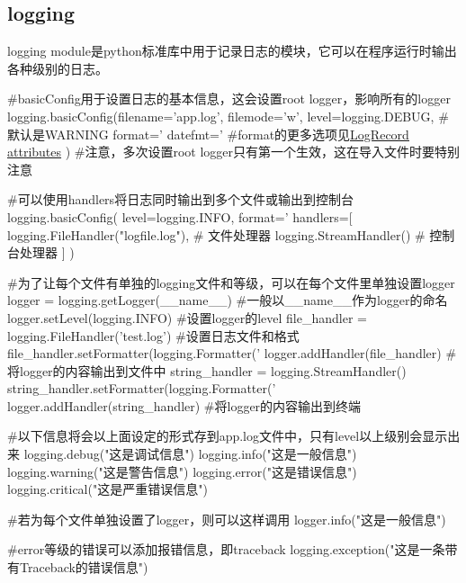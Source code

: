   \subsection{logging}
    logging module是python标准库中用于记录日志的模块，它可以在程序运行时输出各种级别的日志。
    \begin{codeblock}[language=python, caption={logging module}]
      #basicConfig用于设置日志的基本信息，这会设置root logger，影响所有的logger
      logging.basicConfig(filename='app.log', filemode='w', 
                  level=logging.DEBUG, #默认是WARNING
                  format='%
                  datefmt='%
                      #format的更多选项见\href{https://docs.python.org/3/library/logging.html#logrecord-attributes}{\underline{LogRecord attributes}}
                  )
      #注意，多次设置root logger只有第一个生效，这在导入文件时要特别注意

      #可以使用handlers将日志同时输出到多个文件或输出到控制台
      logging.basicConfig(
          level=logging.INFO,
          format='%
          handlers=[
              logging.FileHandler("logfile.log"),   # 文件处理器
              logging.StreamHandler()               # 控制台处理器
          ]
      )

      #为了让每个文件有单独的logging文件和等级，可以在每个文件里单独设置logger
      logger = logging.getLogger(__name__) #一般以\_\_name\_\_作为logger的命名
      logger.setLevel(logging.INFO) #设置logger的level
      file_handler = logging.FileHandler('test.log') #设置日志文件和格式
      file_handler.setFormatter(logging.Formatter('%
      logger.addHandler(file_handler) #将logger的内容输出到文件中
      string_handler = logging.StreamHandler()
      string_handler.setFormatter(logging.Formatter('%
      logger.addHandler(string_handler) #将logger的内容输出到终端

      #以下信息将会以上面设定的形式存到app.log文件中，只有level以上级别会显示出来
      logging.debug("这是调试信息")
      logging.info("这是一般信息")
      logging.warning("这是警告信息")
      logging.error("这是错误信息")
      logging.critical("这是严重错误信息")

      #若为每个文件单独设置了logger，则可以这样调用
      logger.info("这是一般信息")

      #error等级的错误可以添加报错信息，即traceback
      logging.exception("这是一条带有Traceback的错误信息")
    \end{codeblock}

